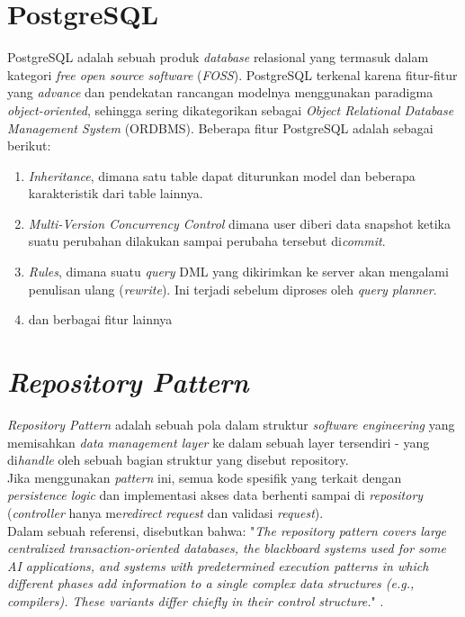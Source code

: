 	\section{  PostgreSQL}
	PostgreSQL adalah sebuah produk \textit{database} relasional yang termasuk dalam kategori \textit{free open source software} (\textit{FOSS}). 
	PostgreSQL terkenal karena fitur-fitur yang \textit{advance} dan pendekatan rancangan modelnya menggunakan paradigma \textit{object-oriented}, sehingga sering dikategorikan sebagai \textit{Object Relational Database Management System} (ORDBMS).
	Beberapa fitur PostgreSQL adalah sebagai berikut:
	\begin{enumerate}
	   	\item \textit{Inheritance}, dimana satu table dapat diturunkan model dan beberapa karakteristik dari table lainnya.
	   	\item \textit{Multi-Version Concurrency Control} dimana user diberi data snapshot ketika suatu perubahan dilakukan sampai perubaha tersebut di\textit{commit}.
	   	\item \textit{Rules}, dimana suatu \textit{query} DML yang dikirimkan ke server akan mengalami penulisan ulang (\textit{rewrite}). Ini terjadi sebelum diproses oleh \textit{query planner}.
	   	\item dan berbagai fitur lainnya \cite{noauthor_postgresql_nodate}
	\end{enumerate}
		
	\section{  \textit{Repository Pattern}}
	\textit{Repository Pattern} adalah sebuah pola dalam struktur \textit{software engineering} yang memisahkan \textit{data management layer} ke dalam sebuah layer tersendiri - yang di\textit{handle} oleh sebuah bagian struktur yang disebut repository. 
	\\ \indent
	Jika menggunakan \textit{pattern} ini, semua kode spesifik yang terkait dengan \textit{persistence logic} dan implementasi akses data berhenti sampai di \textit{repository} (\textit{controller} hanya me\textit{redirect} \textit{request} dan validasi \textit{request})\cite{noauthor_repository_2016}.
	\\ \indent
	Dalam sebuah referensi, disebutkan bahwa: "\textit{The repository pattern covers large centralized transaction-oriented databases, the blackboard systems used for some AI applications, and systems with predetermined execution patterns in which different phases add information to a single complex data structures (e.g., compilers). These variants differ chiefly in their control structure.}" \cite{shaw_patterns_1996}.
	
